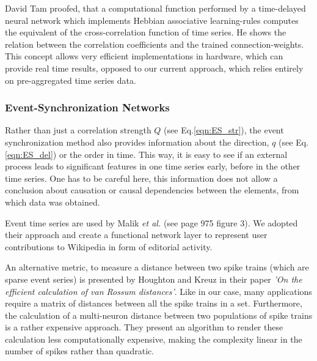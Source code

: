 \documentclass[a4paper,10pt]{scrbook}
\begin{document}
David Tam \cite{Tam2007} proofed, that a computational function performed by a time-delayed neural network which implements Hebbian associative learning-rules computes the equivalent of the cross-correlation function of time series. He shows the relation between the correlation coefficients and the trained connection-weights. This concept allows very efficient implementations in hardware, which can provide real time results, opposed to our current approach, which relies entirely on pre-aggregated time series data.







\subsubsection{Event-Synchronization Networks}
\label{ESN} 
Rather than just a correlation strength $Q$ (see Eq.\ref{eqn:ES_str}), the event synchronization method also provides information about the direction, $q$ (see Eq.\ref{eqn:ES_del}) or the order in time. This way, it is easy to see if an external process leads to significant features in one time series early, before in the other time series. One has to be careful here, this information does not allow a conclusion about causation or causal dependencies between the elements, from which data was obtained.

Event time series are used by Malik \textit{et al.} \cite{Malik2012} (see page 975 figure 3). We adopted their approach and create a functional network layer to represent user contributions to Wikipedia in form of editorial activity. 

An alternative metric, to measure a distance between two spike trains (which are sparse event series) is presented by Houghton and Kreuz \cite{HoughtonKreuz2012a} in their paper \textit{'On the efficient calculation of van Rossum distances'}. 
Like in our case, many applications require a matrix of distances between all the spike trains in a set. Furthermore, the calculation of a multi-neuron distance between two populations of spike trains is a rather expensive approach. They present an algorithm to render these calculation less computationally expensive, making the complexity linear in the number of spikes rather than quadratic. 
\end{document}
